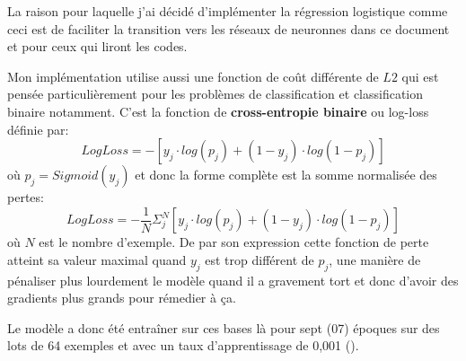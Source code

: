 La raison pour laquelle j'ai décidé d'implémenter la régression logistique comme ceci est de faciliter la transition vers les réseaux de neuronnes dans ce document et pour ceux qui liront les codes.

Mon implémentation utilise aussi une fonction de coût différente de \(L2\) qui est pensée particulièrement pour les problèmes de classification et classification binaire notamment. C'est la fonction de \textbf{cross-entropie binaire} ou log-loss définie par: \[LogLoss = - [y_j \cdot log(p_j) + (1 − y_j)\cdot log(1−p_j)]\] où \(p_j = Sigmoid(\hat{y}_j)\) et donc la forme complète est la somme normalisée des pertes: \[LogLoss = - \frac{1}{N} \Sigma_j^N [y_j \cdot log(p_j) + (1 − y_j)\cdot log(1−p_j)]\] où \(N\) est le nombre d'exemple. De par son expression cette fonction de perte atteint sa valeur maximal quand \(y_j\) est trop différent de \(p_j\), une manière de pénaliser plus lourdement le modèle quand il a gravement tort et donc d'avoir des gradients plus grands pour rémedier à ça.

Le modèle a donc été entraîner sur ces bases là pour sept (07) époques sur des lots de 64 exemples et avec un taux d'apprentissage de 0,001 (\cite{diarra2024notebooks}).